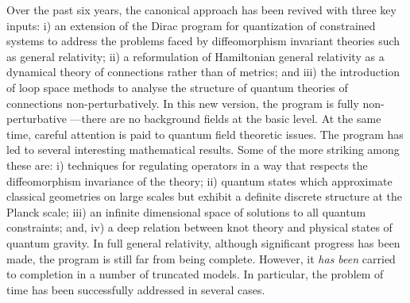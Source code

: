 Over the past six years, the canonical approach has been revived with
three key inputs: i) an extension of the Dirac program for quantization
of constrained systems to address the problems faced by diffeomorphism
invariant theories such as general relativity; ii) a reformulation of
Hamiltonian general relativity as a dynamical theory of connections
rather than of metrics; and iii) the introduction of loop space methods
to analyse the structure of quantum theories of connections
non-perturbatively. In this new version, the program is fully
non-perturbative ---there are no background fields at the basic level.
At the same time, careful attention is paid to quantum field theoretic
issues. The program has led to several interesting mathematical results.
Some of the more striking among these are: i) techniques for regulating
operators in a way that respects the diffeomorphism invariance of the theory;
ii) quantum states which approximate classical geometries on large scales
but exhibit a definite discrete structure at the Planck scale; iii) an
infinite dimensional space of solutions to all quantum constraints; and,
iv) a deep relation between knot theory and physical states of quantum
gravity. In full general relativity, although significant progress has been
made, the program is still far from being complete. However, it {\it has
been} carried to completion in a number of truncated models. In particular,
the problem of time has been successfully addressed in several cases.

